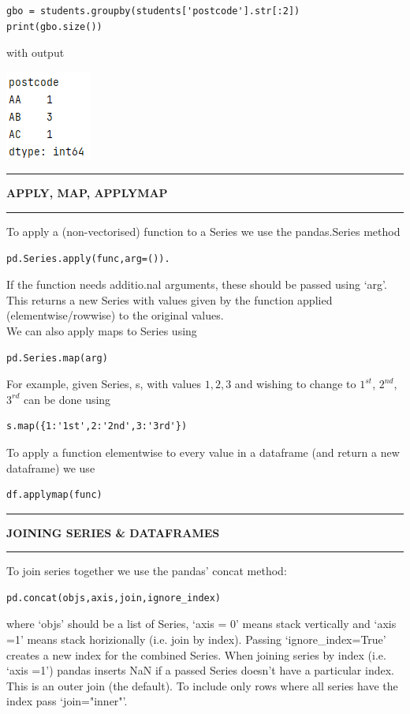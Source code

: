\documentclass[8pt]{extarticle}
\newcommand{\heading}[1]{%
    \noindent
    \rule{\linewidth}{0.4pt}
    \begin{center}
        \vspace{-1ex}
        \textbf{#1}        
        \vspace{-2.5ex}
    \end{center}
    \rule{\linewidth}{0.4pt}
}
\begin{document}
\begin{multicols}{4}
\begin{lstlisting}[style=Python]
gbo = students.groupby(students['postcode'].str[:2])
print(gbo.size())
\end{lstlisting}

with output

\begin{center}
\includegraphics[scale = 0.65]{images/group_by_postcode_area.png}    
\end{center}

\columnbreak

\heading{APPLY, MAP, APPLYMAP}

To apply a (non-vectorised) function to a Series we use the pandas.Series method
\begin{lstlisting}[style=Python]
pd.Series.apply(func,arg=()).
\end{lstlisting}
If the function needs additio.nal arguments, these should be passed using `arg'. This returns a new Series with values given by the function applied (elementwise/rowwise) to the original values.\\

We can also apply maps to Series using
\begin{lstlisting}[style=Python]
pd.Series.map(arg)
\end{lstlisting}
For example, given Series, s, with values $1,2,3$ and wishing to change to $1^{st}$, $2^{nd}$, $3^{rd}$ can be done using
\begin{lstlisting}[style=Python]
s.map({1:'1st',2:'2nd',3:'3rd'})
\end{lstlisting}

To apply a function elementwise to every value in a dataframe (and return a new dataframe) we use
\begin{lstlisting}[style=Python]
df.applymap(func)
\end{lstlisting}

\heading{JOINING SERIES \& DATAFRAMES}

To join series together we use the pandas' concat method:
\begin{lstlisting}[style=Python]
pd.concat(objs,axis,join,ignore_index)
\end{lstlisting}
where `objs' should be a list of Series, `axis = 0' means stack vertically and `axis =1' means stack horizionally (i.e. join by index). Passing `ignore\_index=True' creates a new index for the combined Series. When joining series by index (i.e. `axis =1') pandas inserts NaN if a passed Series doesn't have a  particular index. This is an outer join (the default). To include only rows where all series have the index pass `join="inner"'.\\


\end{multicols}
\end{document}
